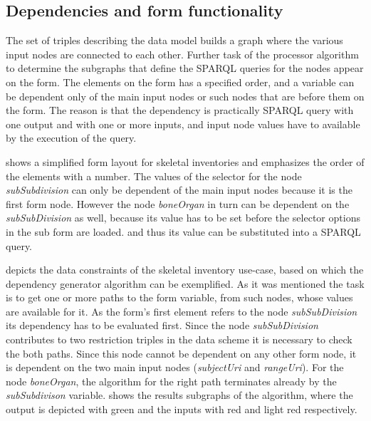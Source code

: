 \subsection{Dependencies and form functionality}  \label{512}

The set of triples describing the data model builds a graph where the various input nodes are connected to each other. Further task of the processor algorithm to determine the subgraphs that define the SPARQL queries for the nodes appear on the form. The elements on the form has a specified order, and a variable can be dependent only of the main input nodes or such nodes that are before them on the form. The reason is that the dependency is practically SPARQL query with one output and with one or more inputs, and input node values have to available by the execution of the query.


 shows a simplified form layout for skeletal inventories and emphasizes the order of the elements with a number. The values of the selector for the node \textit{subSubdivision} can only be dependent of the main input nodes because it is the first form node. However the node \textit{boneOrgan} in turn can be dependent on the \textit{subSubDivision} as well, because its value has to be set before the selector options in the sub form are loaded. and thus its value can be substituted into a SPARQL query.


 depicts the data constraints of the skeletal inventory use-case, based on which the dependency generator algorithm can be exemplified. As it was mentioned the task is to get one or more paths to the form variable, from such nodes, whose values are available for it. As the form's first element refers to the node \textit{subSubDivision} its dependency has to be evaluated first. Since the node \textit{subSubDivision} contributes to two restriction triples in the data scheme it is necessary to check the both paths. Since this node cannot be dependent on any other form node, it is dependent on the two main input nodes (\textit{subjectUri} and \textit{rangeUri}). For the node \textit{boneOrgan}, the algorithm for the right path terminates already by the \textit{subSubdivison} variable.  shows the results subgraphs of the algorithm, where the output is depicted with green and the inputs with red and light red respectively.

